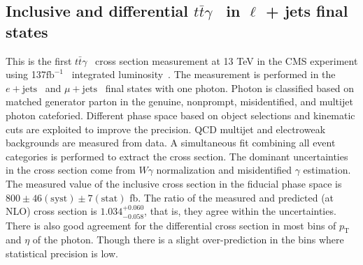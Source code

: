 \documentclass[submission, Proceedings]{SciPost}
\newcommand{\fbinv}{\ensuremath{{\text{fb}^{-1}}}{}}
\newcommand{\pt}{\ensuremath{{p_\text{T}}}}
\newcommand{\Pe}{\ensuremath{{e}}}
\newcommand{\PQt}{\ensuremath{{t}}}
\newcommand{\PAQt}{\ensuremath{{\bar{t}}}}
\newcommand{\ttbar}{{\PQt\PAQt}}
\newcommand{\PW}{\ensuremath{{W}}}
\newcommand{\ttgamma}{\ensuremath{\ttbar\gamma}}
\newcommand{\mujets}{\ensuremath{\mu + \text{jets}}}
\newcommand{\ejets}{\ensuremath{\Pe + \text{jets}}}
\begin{document}
\subsection{Inclusive and differential \ttgamma~ in $\ell$ + jets final states}
This is the first \ttgamma~ cross section measurement at 13 TeV in the CMS experiment using 137\fbinv~
integrated luminosity~\cite{CMS-PAS-TOP-18-010}. The measurement is performed in the \ejets~ and 
\mujets~ final states with one photon. Photon is classified based on matched generator parton in 
the genuine, nonprompt, misidentified, and multijet photon cateforied. Different phase space based 
on object selections and kinematic cuts are exploited to improve the precision. QCD multijet and 
electroweak backgrounds are measured from data. A simultaneous fit combining all event categories is 
performed to extract the cross section. The dominant uncertainties in the cross section come from 
$\PW\gamma$ normalization and misidentified $\gamma$ estimation. The measured value of the inclusive
cross section in  the fiducial phase space is $800 \pm 46 (\text{syst}) \pm 7 (\text{stat})$ fb.
The ratio of the measured and predicted (at NLO) cross section is $1.034^{+0.060}_{-0.058}$,
that is, they agree within the uncertainties. There is also good agreement for the differential 
cross section in most bins of \pt~ and $\eta$ of the photon. Though there is a slight over-prediction
in the bins where statistical precision is low. 
\end{document}
